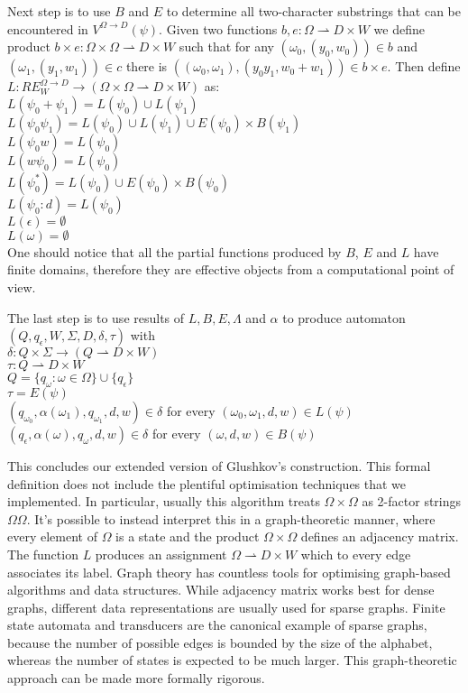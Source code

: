 Next step is to use $B$ and $E$ to determine all two-character substrings that can be encountered in $V^{\Omega\rightarrow D}(\psi)$. Given two functions $b,e:\Omega \rightharpoonup D \times W$ we define product $b \times e : \Omega \times \Omega \rightharpoonup  D \times W$ such that for any $(\omega_0,(y_0,w_0))\in b$ and $(\omega_1,(y_1,w_1)) \in c$ there is $((\omega_0,\omega_1),(y_0y_1,w_0+w_1)) \in b\times e$. Then define $L:RE_W^{\Omega\rightarrow D} \rightarrow (\Omega \times \Omega \rightharpoonup  D \times W)$ as: \\
$L(\psi_0 + \psi_1) = L(\psi_0)\cup L(\psi_1) $ \\
$L(\psi_0 \psi_1) = L(\psi_0) \cup  L(\psi_1) \cup E(\psi_0) \times B(\psi_1)$ \\
$L(\psi_0 w) = L(\psi_0) $ \\
$L(w \psi_0 ) = L(\psi_0)$ \\
$L(\psi_0 ^*) =  L(\psi_0) \cup E(\psi_0) \times B(\psi_0)$ \\
$L(\psi_0 : d) =  L(\psi_0)$ \\
$L(\epsilon) =  \emptyset$ \\
$L(\omega) =  \emptyset$  \\
One should notice that all the partial functions produced by $B$, $E$ and $L$ have finite domains, therefore they are effective objects from a computational point of view. 

The last step is to use results of $L,B,E,\Lambda$ and $\alpha$ to produce automaton $(Q,q_\epsilon,W,\Sigma,D,\delta,\tau)$ with \\
$\delta:Q \times \Sigma \rightarrow (Q\rightharpoonup D\times W)$ \\
$\tau:Q\rightharpoonup D \times W$ \\
$Q = \{q_\omega : \omega \in \Omega \} \cup \{q_\epsilon\}$ \\
$\tau = E(\psi)$ \\
$(q_{\omega_0},\alpha(\omega_1),q_{\omega_1},d,w)  \in \delta$ for every $(\omega_0,\omega_1,d,w) \in L(\psi) $ \\
$(q_\epsilon,\alpha(\omega),q_{\omega},d,w)  \in \delta$ for every $(\omega,d,w) \in B(\psi) $ 

This concludes our extended version of Glushkov's construction. This formal definition does not include the plentiful optimisation techniques that we implemented. In particular, usually this algorithm treats $\Omega \times \Omega$ as 2-factor strings $\Omega\Omega$. It's possible to instead interpret this in a graph-theoretic manner, where every element of $\Omega$ is a state and the product $\Omega \times \Omega$ defines an adjacency matrix. The function $L$ produces an assignment $\Omega \rightharpoonup D \times W$ which to every edge associates its label. Graph theory has countless tools for optimising graph-based algorithms and data structures. While adjacency matrix works best for dense graphs, different data representations are usually used for sparse graphs. Finite state automata and transducers are the canonical example of sparse graphs, because the number of possible edges is bounded by the size of the alphabet, whereas the number of states is expected to be much larger. This graph-theoretic approach can be made more formally rigorous.

